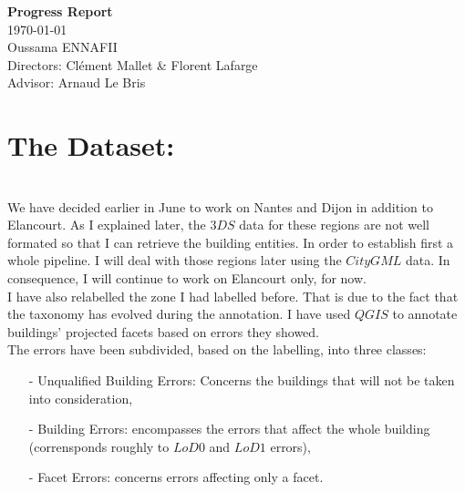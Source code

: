\documentclass[a4paper, 11pt]{article}
\begin{document}
	\begin{centering}
		\Large{\textbf{Progress Report}}\\
		\large{\today}
~\\
		Oussama ENNAFII\\
		Directors: Cl\'ement Mallet \& Florent Lafarge \\
		Advisor: Arnaud Le Bris \\

	\end{centering}


	\section{The Dataset:}
~\\

	We have decided earlier in June to work on Nantes and Dijon in addition to
	Elancourt. As I explained later, the $3DS$ data for these regions are not
	well formated so that I can retrieve the building entities. In order to
	establish first a whole pipeline. I will deal with those regions later using
	the $CityGML$ data. In consequence, I will continue to work on Elancourt
	only, for now.\\

	I have also relabelled the zone I had labelled before. That is due to the fact
	that the taxonomy has evolved during the annotation. I have used $QGIS$ to
	annotate buildings' projected facets based on errors they showed.\\

	The errors have been subdivided, based on the labelling, into three classes:

	\begin{itemize}
		\item[-] Unqualified Building Errors: Concerns the buildings that will not
		be taken into consideration,
		\item[-] Building Errors: encompasses the errors that affect the whole
		building (corrensponds roughly to $LoD0$ and $LoD1$ errors),
		\item[-] Facet Errors: concerns errors affecting only a facet.
	\end{itemize}
\end{document}
